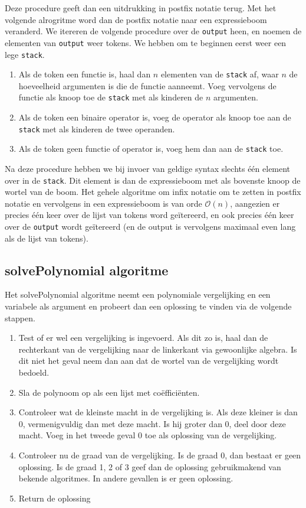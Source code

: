 \documentclass[a4paper]{article}
\newcommand{\ttt}[1]{\texttt{#1}}
\begin{document}
Deze procedure geeft dan een uitdrukking in postfix notatie terug. Met het volgende alrogritme word dan de postfix notatie naar een expressieboom veranderd. We itereren de volgende procedure over de \ttt{output} heen, en noemen de elementen van \ttt{output} weer tokens. We hebben om te beginnen eerst weer een lege \ttt{stack}.
\begin{enumerate}
\item Als de token een functie is, haal dan $n$ elementen van de \ttt{stack} af, waar $n$ de hoeveelheid argumenten is die de functie aanneemt. Voeg vervolgens de functie als knoop toe de \ttt{stack} met als kinderen de $n$ argumenten. 
\item Als de token een binaire operator is, voeg de operator als knoop toe aan de \ttt{stack} met als kinderen de twee operanden.
\item Als de token geen functie of operator is, voeg hem dan aan de \ttt{stack} toe.
\end{enumerate}
Na deze procedure hebben we bij invoer van geldige syntax slechts \'e\'en element over in de \ttt{stack}. Dit element is dan de expressieboom met als bovenste knoop de wortel van de boom. Het gehele algoritme om infix notatie om te zetten in postfix notatie en vervolgens in een expressieboom is van orde $\mathcal{O}(n)$, aangezien er precies \'e\'en keer over de lijst van tokens word ge\"itereerd, en ook precies \'e\'en keer over de \ttt{output} wordt ge\"itereerd (en de output is vervolgens maximaal even lang als de lijst van tokens).

\subsection{solvePolynomial algoritme}
Het solvePolynomial algoritme neemt een polynomiale vergelijking en een variabele als argument en probeert dan een oplossing te vinden via de volgende stappen.
\begin{enumerate}
\item Test of er wel een vergelijking is ingevoerd. Als dit zo is, haal dan de rechterkant van de vergelijking naar de linkerkant via gewoonlijke algebra. Is dit niet het geval neem dan aan dat de wortel van de vergelijking wordt bedoeld.
\item Sla de polynoom op als een lijst met co\"effici\"enten. 
\item Controleer wat de kleinste macht in de vergelijking is. Als deze kleiner is dan 0, vermenigvuldig dan met deze macht. Is hij groter dan 0, deel door deze macht. Voeg in het tweede geval 0 toe als oplossing van de vergelijking.
\item Controleer nu de graad van de vergelijking. Is de graad 0, dan bestaat er geen oplossing. Is de graad 1, 2 of 3 geef dan de oplossing gebruikmakend van bekende algoritmes. In andere gevallen is er geen oplossing.
\item Return de oplossing
\end{enumerate}
\end{document}
